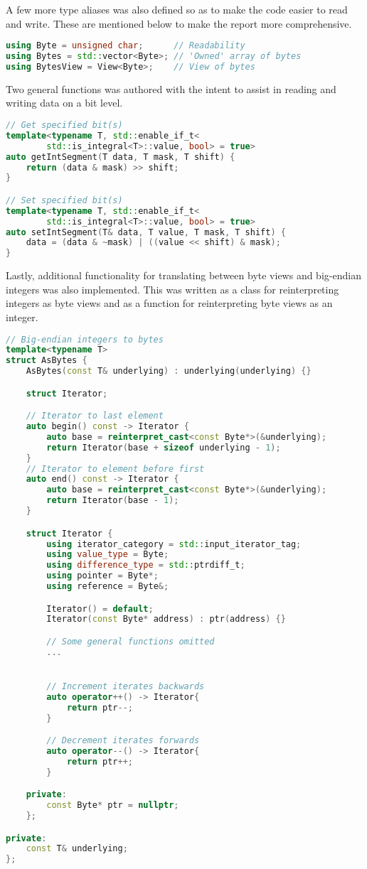 \documentclass[a4paper, titlepage,12pt]{article}
\begin{document}
		A few more type aliases was also defined so as to make the code easier to read and write. These are mentioned below to make the report more comprehensive.

		\begin{lstlisting}[language=C++]
using Byte = unsigned char;		 // Readability
using Bytes = std::vector<Byte>; // 'Owned' array of bytes
using BytesView = View<Byte>;	 // View of bytes
		\end{lstlisting}

		Two general functions was authored with the intent to assist in reading and writing data on a bit level.

		\begin{lstlisting}[language=C++]
// Get specified bit(s)
template<typename T, std::enable_if_t<
		std::is_integral<T>::value, bool> = true>
auto getIntSegment(T data, T mask, T shift) {
	return (data & mask) >> shift;
}

// Set specified bit(s)
template<typename T, std::enable_if_t<
		std::is_integral<T>::value, bool> = true>
auto setIntSegment(T& data, T value, T mask, T shift) {
	data = (data & ~mask) | ((value << shift) & mask);
}
		\end{lstlisting}

		Lastly, additional functionality for translating between byte views and big-endian integers\cite{endianness} was also implemented. This was written as a class for reinterpreting integers as byte views and as a function for reinterpreting byte views as an integer.

		\begin{lstlisting}[language=C++]
// Big-endian integers to bytes
template<typename T>
struct AsBytes {	
	AsBytes(const T& underlying) : underlying(underlying) {}

	struct Iterator;

	// Iterator to last element
	auto begin() const -> Iterator { 
		auto base = reinterpret_cast<const Byte*>(&underlying);
		return Iterator(base + sizeof underlying - 1);
	}
	// Iterator to element before first
	auto end() const -> Iterator { 
		auto base = reinterpret_cast<const Byte*>(&underlying);
		return Iterator(base - 1);
	}

	struct Iterator {
		using iterator_category = std::input_iterator_tag;
		using value_type = Byte;
		using difference_type = std::ptrdiff_t;
		using pointer = Byte*;
		using reference = Byte&;

		Iterator() = default;
		Iterator(const Byte* address) : ptr(address) {}

		// Some general functions omitted
		...


		// Increment iterates backwards
		auto operator++() -> Iterator{
			return ptr--;
		}

		// Decrement iterates forwards
		auto operator--() -> Iterator{
			return ptr++;
		}

	private:
		const Byte* ptr = nullptr;
	};

private:
	const T& underlying;
};
		\end{lstlisting}
\end{document}
